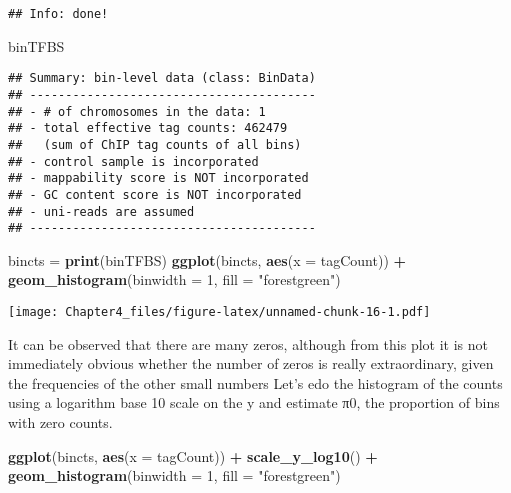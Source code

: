 \documentclass[]{article}
\newenvironment{Shaded}{\begin{snugshade}}{\end{snugshade}}
\newcommand{\DataTypeTok}[1]{\textcolor[rgb]{0.13,0.29,0.53}{#1}}
\newcommand{\DecValTok}[1]{\textcolor[rgb]{0.00,0.00,0.81}{#1}}
\newcommand{\KeywordTok}[1]{\textcolor[rgb]{0.13,0.29,0.53}{\textbf{#1}}}
\newcommand{\NormalTok}[1]{#1}
\newcommand{\OperatorTok}[1]{\textcolor[rgb]{0.81,0.36,0.00}{\textbf{#1}}}
\newcommand{\StringTok}[1]{\textcolor[rgb]{0.31,0.60,0.02}{#1}}
\begin{document}
\begin{verbatim}
## Info: done!
\end{verbatim}

\begin{Shaded}
\begin{Highlighting}[]
\NormalTok{binTFBS}
\end{Highlighting}
\end{Shaded}

\begin{verbatim}
## Summary: bin-level data (class: BinData)
## ----------------------------------------
## - # of chromosomes in the data: 1
## - total effective tag counts: 462479
##   (sum of ChIP tag counts of all bins)
## - control sample is incorporated
## - mappability score is NOT incorporated
## - GC content score is NOT incorporated
## - uni-reads are assumed
## ----------------------------------------
\end{verbatim}

\begin{Shaded}
\begin{Highlighting}[]
\NormalTok{bincts =}\StringTok{ }\KeywordTok{print}\NormalTok{(binTFBS)}
\KeywordTok{ggplot}\NormalTok{(bincts, }\KeywordTok{aes}\NormalTok{(}\DataTypeTok{x =}\NormalTok{ tagCount)) }\OperatorTok{+}
\StringTok{  }\KeywordTok{geom_histogram}\NormalTok{(}\DataTypeTok{binwidth =} \DecValTok{1}\NormalTok{, }\DataTypeTok{fill =} \StringTok{"forestgreen"}\NormalTok{)}
\end{Highlighting}
\end{Shaded}

\texttt{[image: Chapter4\_files/figure-latex/unnamed-chunk-16-1.pdf]}

It can be observed that there are many zeros, although from this plot it
is not immediately obvious whether the number of zeros is really
extraordinary, given the frequencies of the other small numbers Let's
edo the histogram of the counts using a logarithm base 10 scale on the y
and estimate π0, the proportion of bins with zero counts.

\begin{Shaded}
\begin{Highlighting}[]
\KeywordTok{ggplot}\NormalTok{(bincts, }\KeywordTok{aes}\NormalTok{(}\DataTypeTok{x =}\NormalTok{ tagCount)) }\OperatorTok{+}\StringTok{ }\KeywordTok{scale_y_log10}\NormalTok{() }\OperatorTok{+}
\StringTok{   }\KeywordTok{geom_histogram}\NormalTok{(}\DataTypeTok{binwidth =} \DecValTok{1}\NormalTok{, }\DataTypeTok{fill =} \StringTok{"forestgreen"}\NormalTok{)}
\end{Highlighting}
\end{Shaded}
\end{document}
